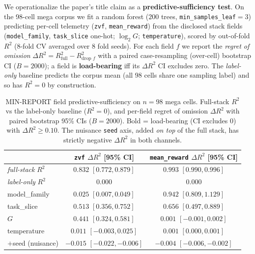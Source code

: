 \documentclass{article}  \usepackage[preprint,nonatbib]{neurips_2026} \usepackage[numbers]{natbib}
\begin{document}
We operationalize the paper's title claim as a \textbf{predictive-sufficiency
test}. On the 98-cell mega corpus we fit a random forest
($200$ trees, \texttt{min\_samples\_leaf}$=3$) predicting per-cell telemetry
(\texttt{zvf}, \texttt{mean\_reward}) from the disclosed stack fields
(\texttt{model\_family}, \texttt{task\_slice} one-hot; $\log_{2}G$;
\texttt{temperature}), scored by out-of-fold $R^{2}$ ($8$-fold CV averaged over
$8$ fold seeds). For each field $f$ we report the \emph{regret of omission}
$\Delta R^{2}=R^{2}_{\text{full}}-R^{2}_{\text{drop }f}$ with a paired
case-resampling (over-cell) bootstrap CI ($B{=}2000$); a field is
\textbf{load-bearing} iff its $\Delta R^{2}$ CI excludes zero. The
\emph{label-only} baseline predicts the corpus mean (all $98$ cells share one
sampling label) and so has $R^{2}=0$ by construction.

\begin{table}[t]
\centering
\caption{MIN-REPORT field predictive-sufficiency on $n{=}98$ mega cells.
Full-stack $R^{2}$ vs the label-only baseline ($R^{2}{=}0$), and per-field
regret of omission $\Delta R^{2}$ with paired bootstrap 95\% CIs
($B{=}2000$). Bold = load-bearing (CI excludes $0$) with
$\Delta R^{2}{\ge}0.10$. The nuisance \texttt{seed} axis, added \emph{on top}
of the full stack, has strictly negative $\Delta R^{2}$ in both channels.}
\label{tab:p5-field-suff}
\small
\begin{tabular}{@{}lcc@{}}
\toprule
 & \texttt{zvf} $\Delta R^{2}$ [95\% CI] & \texttt{mean\_reward} $\Delta R^{2}$ [95\% CI] \\
\midrule
\emph{full-stack} $R^{2}$ & $0.832$ $[0.772,0.879]$ & $0.993$ $[0.990,0.996]$ \\
\emph{label-only} $R^{2}$ & $0.000$ & $0.000$ \\
\midrule
model\_family & $0.025$ $[0.007,0.049]$ & $\mathbf{0.942}$ $[0.809,1.129]$ \\
task\_slice   & $\mathbf{0.513}$ $[0.356,0.752]$ & $\mathbf{0.656}$ $[0.497,0.889]$ \\
$G$           & $\mathbf{0.441}$ $[0.324,0.581]$ & $0.001$ $[-0.001,0.002]$ \\
temperature   & $0.011$ $[-0.003,0.025]$ & $0.001$ $[0.000,0.001]$ \\
\midrule
$+$seed (nuisance) & $-0.015$ $[-0.022,-0.006]$ & $-0.004$ $[-0.006,-0.002]$ \\
\bottomrule
\end{tabular}
\end{table}
\end{document}
